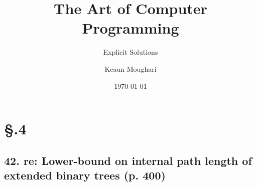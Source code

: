\documentclass[fontsize=11pt, paper=a4]{scrartcl}
\begin{document}

\title{The Art of Computer Programming}
\subtitle{\LARGE Explicit Solutions}
\author{Keaun Moughari} 
\date{\today} 
\maketitle

\setlength{\linewidth}{0.9\linewidth}

\section*{\S {}.4}\label{part: 1.2.4}
\subsection*{42. re: Lower-bound on internal path length of extended binary trees (p. 400)}\label{num: 42}
\end{document}
